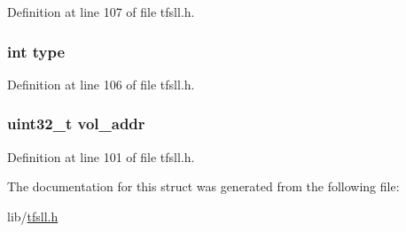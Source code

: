 Definition at line 107 of file tfsll.\+h.

\hypertarget{struct_file_ac765329451135abec74c45e1897abf26}{}
\subsubsection[{type}]{\setlength{\rightskip}{0pt plus 5cm}int type}\label{struct_file_ac765329451135abec74c45e1897abf26}


Definition at line 106 of file tfsll.\+h.

\hypertarget{struct_file_ae2b5f39731a59892a2da3865d1867c19}{}
\subsubsection[{vol\+\_\+addr}]{\setlength{\rightskip}{0pt plus 5cm}uint32\+\_\+t vol\+\_\+addr}\label{struct_file_ae2b5f39731a59892a2da3865d1867c19}


Definition at line 101 of file tfsll.\+h.



The documentation for this struct was generated from the following file\+:\begin{DoxyCompactItemize}
\item 
lib/\hyperlink{tfsll_8h}{tfsll.\+h}\end{DoxyCompactItemize}
